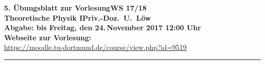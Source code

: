 \documentclass{scrartcl}
\newcommand{\thehandover}{Freitag, den 24.\,November 2017 12:00 Uhr}
\newcommand{\thesemester}{WS 17/18}
\newcommand{\theprofessor}{Priv.-Doz.~U.~Löw}
\begin{document}
{\large\bfseries 5. Übungsblatt zur Vorlesung\hfill\thesemester}\\
{\large\bfseries Theoretische Physik I\hfill\theprofessor}\\
{\large\bfseries Abgabe: bis \thehandover}\\
\textbf{Webseite zur Vorlesung: \\}
\url{https://moodle.tu-dortmund.de/course/view.php?id=9519}\\
\rule{\columnwidth}{0.1ex}
\medskip


\end{document}
